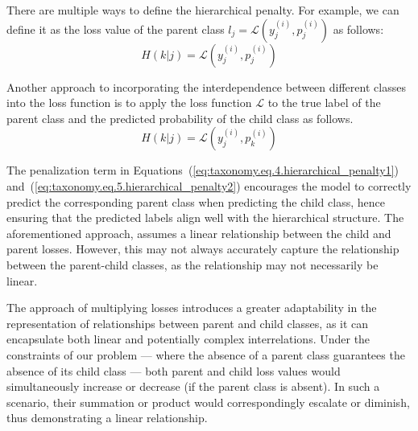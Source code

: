 \documentclass[final,1p,times,authoryear]{elsarticle}
\begin{document}
There are multiple ways to define the hierarchical penalty. For example, we can define it as the loss value of the parent class $l_j=\mathcal{L} \left(y_j^{(i)},p_j^{(i)}\right) $ as follows:
\begin{equation}
    H(k \vert j)=\mathcal{L} \left(y_j^{(i)},p_j^{(i)}\right)
    \label{eq:taxonomy.eq.4.hierarchical_penalty1}
\end{equation}

Another approach to incorporating the interdependence between different classes into the loss function is to apply the loss function $\mathcal{L} $ to the true label of the parent class and the predicted probability of the child class as follows.
\begin{equation}
    H(k\vert j)  = \mathcal{L} \left(y_j^{(i)},p_k^{(i)}\right)
    \label{eq:taxonomy.eq.5.hierarchical_penalty2}
\end{equation}

The penalization term in Equations~(\ref{eq:taxonomy.eq.4.hierarchical_penalty1}) and~(\ref{eq:taxonomy.eq.5.hierarchical_penalty2}) encourages the model to correctly predict the corresponding parent class when predicting the child class, hence ensuring that the predicted labels  align well with the hierarchical structure. The aforementioned approach, assumes a linear relationship  between the child and parent losses. However, this may not always accurately capture the relationship between the parent-child classes, as the relationship may not necessarily be linear.

The approach of multiplying losses introduces a greater adaptability in the representation of relationships between parent and child classes, as it can encapsulate both linear and potentially complex interrelations. Under the constraints of our problem --- where the absence of a parent class guarantees the absence of its child class --- both parent and child loss values would simultaneously increase or decrease (if the parent class is absent). In such a scenario, their summation or product would correspondingly escalate or diminish, thus demonstrating a linear relationship.
\end{document}

